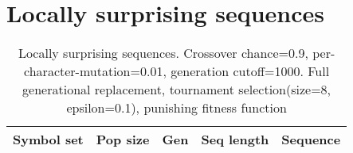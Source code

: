 \section{Locally surprising sequences}

\begin{table}[H]
\begin{tabularx}{\textwidth}{ l l l l X }

\hline
\hline
Symbol set & Pop size & Gen & Seq length & Sequence \\
\hline

\end{tabularx}
\caption{Locally surprising sequences. Crossover chance=0.9, per-character-mutation=0.01, generation cutoff=1000. Full generational replacement, tournament selection(size=8, epsilon=0.1), punishing fitness function}
\end{table}